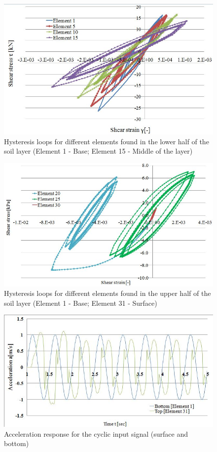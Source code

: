 	\begin{figure}[h!]
		\centering
		\includegraphics[width=0.7\linewidth]{"response1"}
		\caption[]{Hysteresis loops for different elements found in the lower half of the soil layer (Element 1 - Base; Element 15 - Middle of the layer)}
		\label{response1}
	\end{figure}
	
	\begin{figure}[h!]
		\centering
		\includegraphics[width=0.7\linewidth]{"response2"}
		\caption[]{Hysteresis loops for different elements found in the upper half of the soil layer (Element 1 - Base; Element 31 - Surface)}
		\label{response2}
	\end{figure}
	
	\begin{figure}[h!]
		\centering
		\includegraphics[width=0.6\linewidth]{"acc_response1"}
		\caption{Acceleration response for the cyclic input signal (surface and bottom)}
		\label{acc1}
	\end{figure}
	
